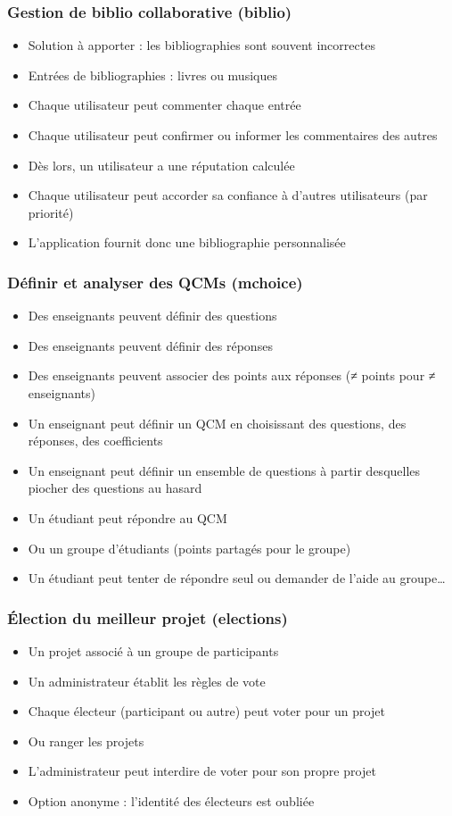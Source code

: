 \documentclass[english, french]{beamer}
\begin{document}
\begin{frame}
	\frametitle{Gestion de biblio collaborative (biblio)}
	\begin{itemize}
		\item Solution à apporter : les bibliographies sont souvent incorrectes
		\item Entrées de bibliographies : livres ou musiques
		\item Chaque utilisateur peut commenter chaque entrée
		\item Chaque utilisateur peut confirmer ou informer les commentaires des autres
		\item Dès lors, un utilisateur a une réputation calculée
		\item Chaque utilisateur peut accorder sa confiance à d’autres utilisateurs (par priorité)
		\item L’application fournit donc une bibliographie personnalisée
	\end{itemize}
\end{frame}

\begin{frame}
	\frametitle{Définir et analyser des QCMs (mchoice)}
	\begin{itemize}
		\item Des enseignants peuvent définir des questions
		\item Des enseignants peuvent définir des réponses
		\item Des enseignants peuvent associer des points aux réponses ({≠} points pour ≠ enseignants)
		\item Un enseignant peut définir un QCM en choisissant des questions, des réponses, des coefficients
		\item Un enseignant peut définir un ensemble de questions à partir desquelles piocher des questions au hasard
		\item Un étudiant peut répondre au QCM
		\item Ou un groupe d’étudiants (points partagés pour le groupe)
		\item Un étudiant peut tenter de répondre seul ou demander de l’aide au groupe…
	\end{itemize}
\end{frame}

\begin{frame}
	\frametitle{Élection du meilleur projet (elections)}
	\begin{itemize}
		\item Un projet associé à un groupe de participants
		\item Un administrateur établit les règles de vote
		\item Chaque électeur (participant ou autre) peut voter pour un projet
		\item Ou ranger les projets
		\item L’administrateur peut interdire de voter pour son propre projet
		\item Option anonyme : l’identité des électeurs est oubliée
	\end{itemize}
\end{frame}
\end{document}
